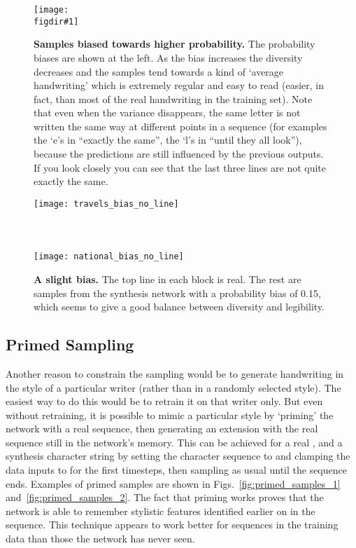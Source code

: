 \documentclass{article}
\newcommand{\flabel}[1]{\label{fig:#1}}
\newcommand{\figdir}{}
\newcommand{\capt}[2]{\caption[#1]{\textbf{#1}#2}}
\newcommand{\fig}[5]
{
\begin{figure}
\begin{center}
\texttt{[image: \\figdir\#1]}
\end{center}
\capt{#4}{#5}
\flabel{#2}
\end{figure}
}
\begin{document}
\fig{biased_numbers}{synth_biased}{0.9}{Samples biased towards higher probability.}{ The probability biases  are shown at the left. As the bias increases the diversity decreases and the samples tend towards a kind of `average handwriting' which is extremely regular and easy to read (easier, in fact, than most of the real handwriting in the training set).
Note that even when the variance disappears, the same letter is not written the same way at different points in a sequence (for examples the `e's in ``exactly the same'', the `l's in ``until they all look''), because the predictions are still influenced by the previous outputs.
If you look closely you can see that the last three lines are not quite exactly the same.}

\begin{figure}
\texttt{[image: travels\_bias\_no\_line]}\\
\\
\\
\\
\texttt{[image: national\_bias\_no\_line]}
\\
\caption{\textbf{A slight bias.} The top line in each block is real. The rest are samples from the synthesis network with a probability bias of 0.15, which seems to give a good balance between diversity and legibility.}
\flabel{synth_val_bias}
\end{figure}


\subsection{Primed Sampling}
Another reason to constrain the sampling would be to generate handwriting in the style of a particular writer (rather than in a randomly selected style).
The easiest way to do this would be to retrain it on that writer only.
But even without retraining, it is possible to mimic a particular style by `priming' the network with a real sequence, then generating an extension with the real sequence still in the network's memory.
This can be achieved for a real ,  and a synthesis character string  by setting the character sequence to  and clamping the data inputs to  for the first  timesteps, then sampling as usual until the sequence ends.
Examples of primed samples are shown in Figs.~\ref{fig:primed_samples_1} and~\ref{fig:primed_samples_2}.
The fact that priming works proves that the network is able to remember stylistic features identified earlier on in the sequence.
This technique appears to work better for sequences in the training data than those the network has never seen.
\end{document}
